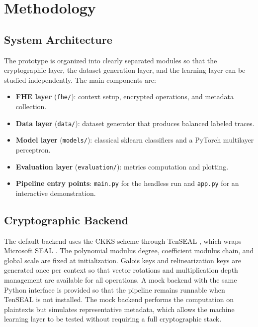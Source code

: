 \documentclass[12pt,a4paper]{article}
\begin{document}
\section{Methodology}

\subsection{System Architecture}
The prototype is organized into clearly separated modules so that the cryptographic layer, the dataset generation layer, and the learning layer can be studied independently. The main components are:
\begin{itemize}[leftmargin=*]
  \item \textbf{FHE layer} (\texttt{fhe/}): context setup, encrypted operations, and metadata collection.
  \item \textbf{Data layer} (\texttt{data/}): dataset generator that produces balanced labeled traces.
  \item \textbf{Model layer} (\texttt{models/}): classical sklearn classifiers and a PyTorch multilayer perceptron.
  \item \textbf{Evaluation layer} (\texttt{evaluation/}): metrics computation and plotting.
  \item \textbf{Pipeline entry points}: \texttt{main.py} for the headless run and \texttt{app.py} for an interactive demonstration.
\end{itemize}


\subsection{Cryptographic Backend}
The default backend uses the CKKS scheme through TenSEAL \cite{benaissa2021tenseal}, which wraps Microsoft SEAL \cite{sealcrypto}. The polynomial modulus degree, coefficient modulus chain, and global scale are fixed at initialization. Galois keys and relinearization keys are generated once per context so that vector rotations and multiplication depth management are available for all operations. A mock backend with the same Python interface is provided so that the pipeline remains runnable when TenSEAL is not installed. The mock backend performs the computation on plaintexts but simulates representative metadata, which allows the machine learning layer to be tested without requiring a full cryptographic stack.
\end{document}
